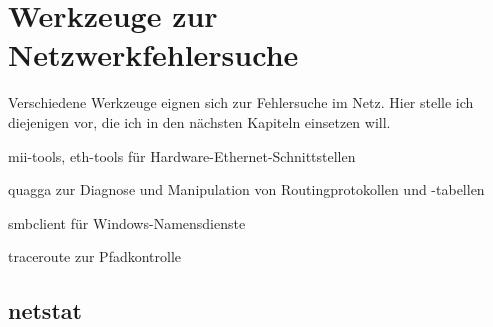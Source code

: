\chapter{Werkzeuge zur Netzwerkfehlersuche}
\label{cha:netz-werkzeuge}

\begin{abstractsec}
  Verschiedene Werkzeuge eignen sich zur Fehlersuche im Netz. Hier stelle ich
  diejenigen vor, die ich in den nächsten Kapiteln einsetzen will.
\end{abstractsec}

\begin{notes}
\item[mii-tools, eth-tools] für Hardware-Ethernet-Schnittstellen
\item[quagga] zur Diagnose und Manipulation von Routingprotokollen und
  -tabellen
\item[smbclient] für Windows-Namensdienste
\item[traceroute] zur Pfadkontrolle
\end{notes}

\section{netstat}
\label{sec:netz-werkzeuge-netstat}

